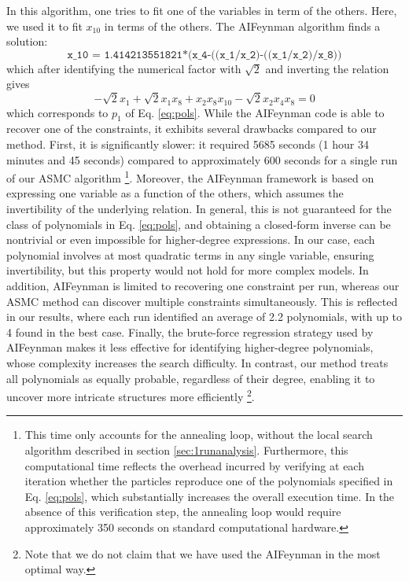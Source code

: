 \documentclass[11pt,a4paper]{article}
\begin{document}
In this algorithm, one tries to fit one of the variables in term of the others. Here, we used it to fit $x_{10}$ in terms of the others. The AIFeynman algorithm finds a solution: 
\begin{equation}
	\texttt{x\_10 = 1.414213551821*(x\_4-((x\_1/x\_2)-((x\_1/x\_2)/x\_8))}
\end{equation}
which after identifying the numerical factor with $\sqrt 2$ and inverting the relation gives 
\begin{equation}
	- \sqrt 2 x_1 + \sqrt 2 x_1 x_8 + x_2 x_8  x_{10} -\sqrt 2 x_2 x_4 x_8 = 0
\end{equation}
which corresponds to $p_1$ of Eq. \eqref{eq:pols}. While the AIFeynman code is able to recover one of the constraints, it exhibits several drawbacks compared to our method. First, it is significantly slower: it required 5685 seconds (1 hour 34 minutes and 45 seconds) compared to approximately 600 seconds for a single run of our ASMC algorithm \footnote{This time only accounts for the annealing loop, without the local search algorithm described in section \ref{sec:1runanalysis}. Furthermore, this computational time reflects the overhead incurred by verifying at each iteration whether the particles reproduce one of the polynomials specified in Eq. \eqref{eq:pols}, which substantially increases the overall execution time. In the absence of this verification step, the annealing loop would require approximately 350 seconds on standard computational hardware.}. Moreover, the AIFeynman framework is based on expressing one variable as a function of the others, which assumes the invertibility of the underlying relation. In general, this is not guaranteed for the class of polynomials in Eq. \eqref{eq:pols}, and obtaining a closed-form inverse can be nontrivial or even impossible for higher-degree expressions. In our case, each polynomial involves at most quadratic terms in any single variable, ensuring invertibility, but this property would not hold for more complex models. In addition, AIFeynman is limited to recovering one constraint per run, whereas our ASMC method can discover multiple constraints simultaneously. This is reflected in our results, where each run identified an average of 2.2 polynomials, with up to 4 found in the best case. Finally, the brute-force regression strategy used by AIFeynman makes it less effective for identifying higher-degree polynomials, whose complexity increases the search difficulty. In contrast, our method treats all polynomials as equally probable, regardless of their degree, enabling it to uncover more intricate structures more efficiently \footnote{Note that we do not claim that we have used the AIFeynman in the most optimal way.}.
\end{document}
